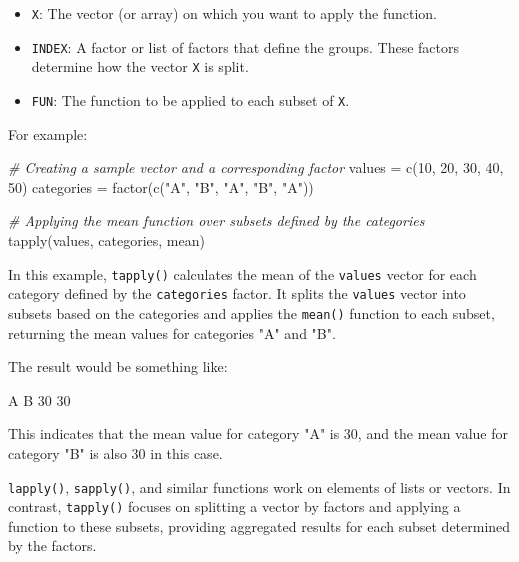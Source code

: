 \documentclass[
]{article}
\newenvironment{Shaded}{}{}
\newcommand{\CommentTok}[1]{\textcolor[rgb]{0.38,0.63,0.69}{\textit{#1}}}
\newcommand{\DecValTok}[1]{\textcolor[rgb]{0.25,0.63,0.44}{#1}}
\newcommand{\FunctionTok}[1]{\textcolor[rgb]{0.02,0.16,0.49}{#1}}
\newcommand{\NormalTok}[1]{#1}
\newcommand{\OtherTok}[1]{\textcolor[rgb]{0.00,0.44,0.13}{#1}}
\newcommand{\StringTok}[1]{\textcolor[rgb]{0.25,0.44,0.63}{#1}}
\begin{document}
\begin{itemize}
\item
  \texttt{X}: The vector (or array) on which you want to apply the
  function.
\item
  \texttt{INDEX}: A factor or list of factors that define the groups.
  These factors determine how the vector \texttt{X} is split.
\item
  \texttt{FUN}: The function to be applied to each subset of \texttt{X}.
\end{itemize}

For example:

\begin{Shaded}
\begin{Highlighting}[]
\CommentTok{\# Creating a sample vector and a corresponding factor}
\NormalTok{values }\OtherTok{=} \FunctionTok{c}\NormalTok{(}\DecValTok{10}\NormalTok{, }\DecValTok{20}\NormalTok{, }\DecValTok{30}\NormalTok{, }\DecValTok{40}\NormalTok{, }\DecValTok{50}\NormalTok{)}
\NormalTok{categories }\OtherTok{=} \FunctionTok{factor}\NormalTok{(}\FunctionTok{c}\NormalTok{(}\StringTok{"A"}\NormalTok{, }\StringTok{"B"}\NormalTok{, }\StringTok{"A"}\NormalTok{, }\StringTok{"B"}\NormalTok{, }\StringTok{"A"}\NormalTok{))}

\CommentTok{\# Applying the mean function over subsets defined by the categories}
\FunctionTok{tapply}\NormalTok{(values, categories, mean)}
\end{Highlighting}
\end{Shaded}

In this example, \texttt{tapply()} calculates the mean of the
\texttt{values} vector for each category defined by the
\texttt{categories} factor. It splits the \texttt{values} vector into
subsets based on the categories and applies the \texttt{mean()} function
to each subset, returning the mean values for categories "A" and "B".

The result would be something like:

\begin{Shaded}
\begin{Highlighting}[]
\NormalTok{A    B }
\NormalTok{30   30}
\end{Highlighting}
\end{Shaded}

This indicates that the mean value for category "A" is 30, and the mean
value for category "B" is also 30 in this case.

\texttt{lapply()}, \texttt{sapply()}, and similar functions work on
elements of lists or vectors. In contrast, \texttt{tapply()} focuses on
splitting a vector by factors and applying a function to these subsets,
providing aggregated results for each subset determined by the factors.
\end{document}
